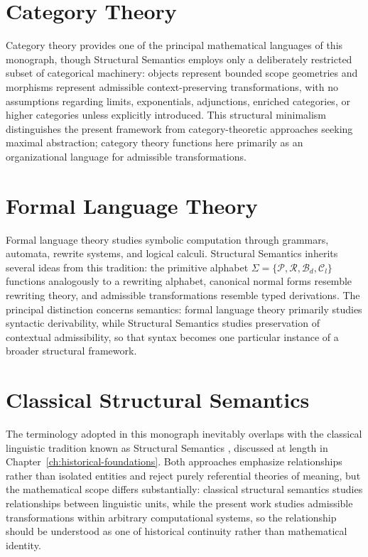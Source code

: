 \documentclass[11pt,twoside,openright]{book}
\numberwithin{equation}{chapter}
\theoremstyle{definition}
\theoremstyle{plain}
\theoremstyle{remark}
\theoremstyle{definition}
\newcommand{\Alphabet}{\Sigma}
\newcommand{\Pop}{\mathcal{P}}
\newcommand{\Refuse}{\mathcal{R}}
\newcommand{\Bind}{\mathcal{B}_d}
\newcommand{\Collapse}{\mathcal{C}_l}
\newcommand{\ScopeAlphabet}{\Alphabet=\{\Pop,\Refuse,\Bind,\Collapse\}}
\begin{document}
\section{Category Theory}

Category theory provides one of the principal mathematical languages of
this monograph, though Structural Semantics employs only a deliberately
restricted subset of categorical machinery: objects represent bounded
scope geometries and morphisms represent admissible context-preserving
transformations, with no assumptions regarding limits, exponentials,
adjunctions, enriched categories, or higher categories unless explicitly
introduced. This structural minimalism distinguishes the present
framework from category-theoretic approaches seeking maximal abstraction;
category theory functions here primarily as an organizational language
for admissible transformations.

\section{Formal Language Theory}

Formal language theory studies symbolic computation through grammars,
automata, rewrite systems, and logical calculi. Structural Semantics
inherits several ideas from this tradition: the primitive alphabet
$\ScopeAlphabet$ functions analogously to a rewriting alphabet, canonical
normal forms resemble rewriting theory, and admissible transformations
resemble typed derivations. The principal distinction concerns
semantics: formal language theory primarily studies syntactic
derivability, while Structural Semantics studies preservation of
contextual admissibility, so that syntax becomes one particular instance
of a broader structural framework.

\section{Classical Structural Semantics}

The terminology adopted in this monograph inevitably overlaps with the
classical linguistic tradition known as Structural Semantics
\cite{Lyons1977,Coseriu1977}, discussed at length in
Chapter~\ref{ch:historical-foundations}. Both approaches emphasize
relationships rather than isolated entities and reject purely referential
theories of meaning, but the mathematical scope differs substantially:
classical structural semantics studies relationships between linguistic
units, while the present work studies admissible transformations within
arbitrary computational systems, so the relationship should be
understood as one of historical continuity rather than mathematical
identity.
\end{document}
